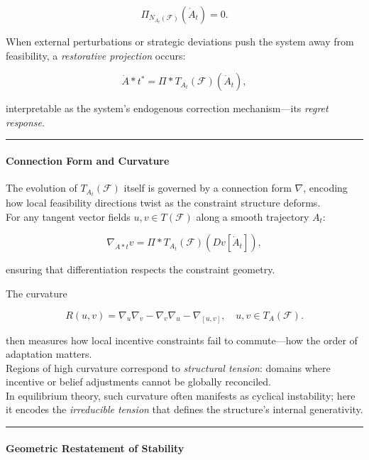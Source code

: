 \documentclass[11pt]{article}
\begin{document}
\[
\Pi_{N_{A_t}(\mathcal{F})}(\dot{A}_t) = 0.
\]

When external perturbations or strategic deviations push the system away
from feasibility, a \emph{restorative projection} occurs:

\[
\dot{A}*t^{\ast} = \Pi*{T_{A_t}(\mathcal{F})}(\dot{A}_t),
\]

interpretable as the system's endogenous correction mechanism---its
\emph{regret response}.

\begin{center}\rule{0.5\linewidth}{0.5pt}\end{center}

\paragraph{\texorpdfstring{\textbf{Connection Form and
Curvature}}{Connection Form and Curvature}}\label{connection-form-and-curvature}

The evolution of \(T_{A_t}(\mathcal{F})\) itself is governed by a
connection form \(\nabla\), encoding how local feasibility directions
twist as the constraint structure deforms.\\
For any tangent vector fields \(u,v \in T(\mathcal{F})\) along a smooth
trajectory \(A_t\):

\[
\nabla_{\dot{A}*t} v = \Pi*{T_{A_t}(\mathcal{F})} ( Dv[\dot{A}_t] ),
\]

ensuring that differentiation respects the constraint geometry.

The curvature

\[
R(u,v) = \nabla_u\nabla_v - \nabla_v\nabla_u - \nabla_{[u,v]},\quad u,v \in T_A(\mathcal{F}).
\]

then measures how local incentive constraints fail to commute---how the
order of adaptation matters.\\
Regions of high curvature correspond to \emph{structural tension}:
domains where incentive or belief adjustments cannot be globally
reconciled.\\
In equilibrium theory, such curvature often manifests as cyclical
instability; here it encodes the \emph{irreducible tension} that defines
the structure's internal generativity.

\begin{center}\rule{0.5\linewidth}{0.5pt}\end{center}

\paragraph{\texorpdfstring{\textbf{Geometric Restatement of
Stability}}{Geometric Restatement of Stability}}\label{geometric-restatement-of-stability}
\end{document}
